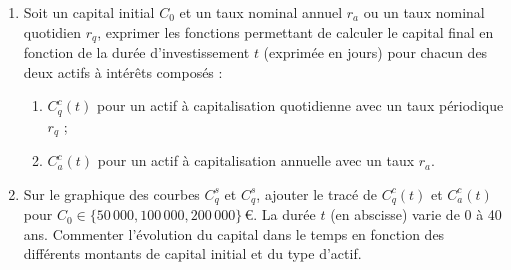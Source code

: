 \documentclass{article}
\begin{document}
\begin{enumerate}[label=\textbf{R1.\arabic*}]
    \item Soit un capital initial \( C_0 \) et un taux nominal annuel \( r_a \) ou un taux nominal quotidien \( r_q \), exprimer les fonctions permettant de calculer le capital final en fonction de la durée d'investissement \( t \) (exprimée en jours) pour chacun des deux actifs à intérêts composés :
        \begin{enumerate}[label=(\alph*)]
            \item \( C^c_q(t) \) pour un actif à capitalisation quotidienne avec un taux périodique \( r_q \) ;
            \item \( C^c_a(t) \) pour un actif à capitalisation annuelle avec un taux \( r_a \).
        \end{enumerate}
    
    \item Sur le graphique des courbes $C^s_q$ et $C^s_q$, ajouter le tracé de \( C^c_q(t) \) et \( C^c_a(t) \) pour \( C_0 \in \{50\,000, 100\,000, 200\,000\} \, \text{€} \). La durée \( t \) (en abscisse) varie de 0 à 40 ans. Commenter l'évolution du capital dans le temps en fonction des différents montants de capital initial et du type d'actif.
    
\end{enumerate}
\end{document}
